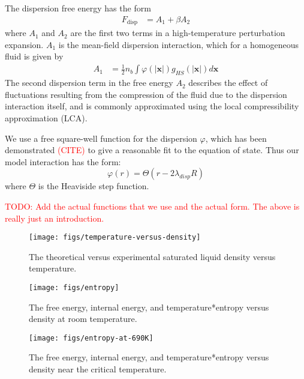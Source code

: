 \documentclass[letterpaper,twocolumn,amsmath,amssymb,prb]{revtex4-1}
\newcommand{\xx}{\textbf{x}}
\begin{document}
The dispersion free energy has the form~\cite{gil-villegas-1997-SAFT-VR}
\begin{align}
  F_\text{disp} &= A_1 + \beta A_2
\end{align}
where $A_1$ and $A_2$ are the first two terms in a high-temperature
perturbation expansion.  $A_1$ is the mean-field dispersion
interaction, which for a homogeneous fluid is given by
\begin{align}
  A_1 &= \frac12 n_b \int \varphi(\left|\xx\right|)
  g_{HS}(\left|\xx\right|) d\xx
\end{align}
The second dispersion term in the free energy $A_2$ describes the
effect of fluctuations resulting from the compression of the fluid due
to the dispersion interaction itself, and is commonly approximated
using the local compressibility approximation (LCA).

We use a free square-well function for the dispersion $\varphi$, which
has been demonstrated \textcolor{red}{(CITE)} to give a reasonable fit
to the equation of state.  Thus our model interaction has the form:
\begin{equation}
  \varphi(r) = \Theta(r-2 \lambda_\textit{disp} R)
\end{equation}
where $\Theta$ is the Heaviside step function.

\textcolor{red}{TODO:  Add the actual functions that we use and the
  actual form.  The above is really just an introduction.}


\begin{figure}
\begin{center}
\texttt{[image: figs/temperature-versus-density]}
\end{center}
\caption{The theoretical versus experimental saturated liquid density
  versus temperature.  }
\label{fig:saturated-liquid-density}
\end{figure}

\begin{figure}
\begin{center}
\texttt{[image: figs/entropy]}
\end{center}
\caption{The free energy, internal energy, and temperature*entropy versus density at room temperature.  }
\label{fig:energy-room-temp}
\end{figure}

\begin{figure}
\begin{center}
\texttt{[image: figs/entropy-at-690K]}
\end{center}
\caption{The free energy, internal energy, and temperature*entropy versus density near the critical temperature.  }
\label{fig:energy-near-critical-temp}
\end{figure}
\end{document}
